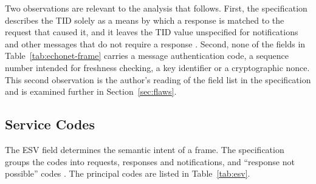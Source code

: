 Two observations are relevant to the analysis that follows. First, the specification describes the TID solely as a means by which a response is matched to the request that caused it, and it leaves the TID value unspecified for notifications and other messages that do not require a response \cite{ECHONETPart2}. Second, none of the fields in Table~\ref{tab:echonet-frame} carries a message authentication code, a sequence number intended for freshness checking, a key identifier or a cryptographic nonce. This second observation is the author's reading of the field list in the specification and is examined further in Section~\ref{sec:flaws}.

\subsection{Service Codes}

The ESV field determines the semantic intent of a frame. The specification groups the codes into requests, responses and notifications, and ``response not possible'' codes \cite{ECHONETPart2}. The principal codes are listed in Table~\ref{tab:esv}.

